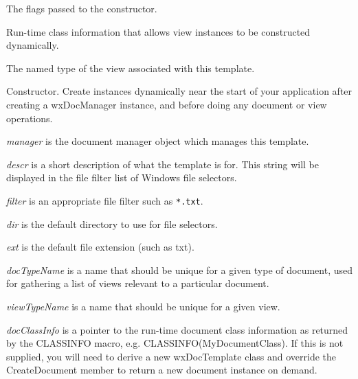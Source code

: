 

The flags passed to the constructor.



Run-time class information that allows view instances to be constructed dynamically.



The named type of the view associated with this template.



Constructor. Create instances dynamically near the start of your application after creating
a wxDocManager instance, and before doing any document or view operations.

{\it manager} is the document manager object which manages this template.

{\it descr} is a short description of what the template is for. This string will be displayed in the
file filter list of Windows file selectors.

{\it filter} is an appropriate file filter such as \verb$*.txt$.

{\it dir} is the default directory to use for file selectors.

{\it ext} is the default file extension (such as txt).

{\it docTypeName} is a name that should be unique for a given type of document, used for
gathering a list of views relevant to a particular document.

{\it viewTypeName} is a name that should be unique for a given view.

{\it docClassInfo} is a pointer to the run-time document class information as returned
by the CLASSINFO macro, e.g. CLASSINFO(MyDocumentClass). If this is not supplied,
you will need to derive a new wxDocTemplate class and override the CreateDocument
member to return a new document instance on demand.

